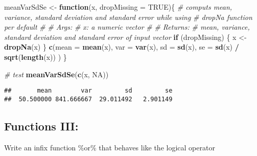 \documentclass[12,]{article}
\newenvironment{Shaded}{\begin{snugshade}}{\end{snugshade}}
\newcommand{\KeywordTok}[1]{\textcolor[rgb]{0.13,0.29,0.53}{\textbf{#1}}}
\newcommand{\DataTypeTok}[1]{\textcolor[rgb]{0.13,0.29,0.53}{#1}}
\newcommand{\StringTok}[1]{\textcolor[rgb]{0.31,0.60,0.02}{#1}}
\newcommand{\CommentTok}[1]{\textcolor[rgb]{0.56,0.35,0.01}{\textit{#1}}}
\newcommand{\OtherTok}[1]{\textcolor[rgb]{0.56,0.35,0.01}{#1}}
\newcommand{\ControlFlowTok}[1]{\textcolor[rgb]{0.13,0.29,0.53}{\textbf{#1}}}
\newcommand{\OperatorTok}[1]{\textcolor[rgb]{0.81,0.36,0.00}{\textbf{#1}}}
\newcommand{\NormalTok}[1]{#1}
\begin{document}
\begin{Shaded}
\begin{Highlighting}[]
\NormalTok{meanVarSdSe <-}\StringTok{ }\ControlFlowTok{function}\NormalTok{(x, }\DataTypeTok{dropMissing =} \OtherTok{TRUE}\NormalTok{)\{}
  \CommentTok{# computs mean, variance, standard deviation and standard error while using }
  \CommentTok{# dropNa function per default}
  \CommentTok{#}
  \CommentTok{# Args:}
  \CommentTok{#   x: a numeric vector}
  \CommentTok{#}
  \CommentTok{# Returns:}
  \CommentTok{#   mean, variance, standard deviation and standard error of input vector}
  \ControlFlowTok{if}\NormalTok{ (dropMissing) \{}
\NormalTok{    x <-}\StringTok{ }\KeywordTok{dropNa}\NormalTok{(x)}
\NormalTok{  \}}
  \KeywordTok{c}\NormalTok{(}\DataTypeTok{mean =} \KeywordTok{mean}\NormalTok{(x),}
    \DataTypeTok{var =} \KeywordTok{var}\NormalTok{(x),}
    \DataTypeTok{sd =} \KeywordTok{sd}\NormalTok{(x),}
    \DataTypeTok{se =} \KeywordTok{sd}\NormalTok{(x) }\OperatorTok{/}\StringTok{ }\KeywordTok{sqrt}\NormalTok{(}\KeywordTok{length}\NormalTok{(x))}
\NormalTok{  )}
\NormalTok{\}}

\CommentTok{# test}
\KeywordTok{meanVarSdSe}\NormalTok{(}\KeywordTok{c}\NormalTok{(x, }\OtherTok{NA}\NormalTok{))}
\end{Highlighting}
\end{Shaded}

\begin{verbatim}
##       mean        var         sd         se 
##  50.500000 841.666667  29.011492   2.901149
\end{verbatim}

\subsection{Functions III:}\label{functions-iii}

Write an infix function \%or\% that behaves like the logical operator
\textbar{}

\begin{Shaded}
\end{Shaded}
\end{document}
